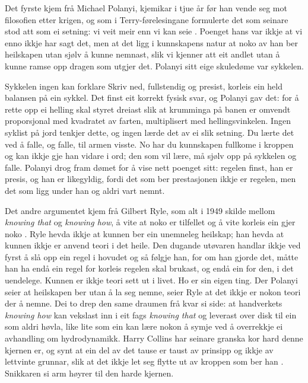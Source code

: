 Det fyrste kjem frå Michael Polanyi, kjemikar i tjue år før han vende seg mot filosofien etter krigen, og som i Terry-førelesingane formulerte det som seinare stod att som ei setning: vi veit meir enn vi kan seie \autocite{polanyi1966tacit}. Poenget hans var ikkje at vi enno ikkje har sagt det, men at det ligg i kunnskapens natur at noko av han ber heilskapen utan sjølv å kunne nemnast, slik vi kjenner att eit andlet utan å kunne ramse opp dragen som utgjer det. Polanyi sitt eige skuledøme var sykkelen.

\begin{kasus}{Sykkelen ingen kan forklare}
Skriv ned, fullstendig og presist, korleis ein held balansen på ein sykkel. Det finst eit korrekt fysisk svar, og Polanyi gav det: for å rette opp ei helling skal styret dreiast slik at krumminga på banen er omvendt proporsjonal med kvadratet av farten, multiplisert med hellingsvinkelen. Ingen syklist på jord tenkjer dette, og ingen lærde det av ei slik setning. Du lærte det ved å falle, og falle, til armen visste. No har du kunnskapen fullkome i kroppen og kan ikkje gje han vidare i ord; den som vil lære, må sjølv opp på sykkelen og falle. Polanyi drog fram dømet for å vise nett poenget sitt: regelen finst, han er presis, og han er likegyldig, fordi det som ber prestasjonen ikkje er regelen, men det som ligg under han og aldri vart nemnt.
\end{kasus}

Det andre argumentet kjem frå Gilbert Ryle, som alt i 1949 skilde mellom \emph{knowing that} og \emph{knowing how}, å vite at noko er tilfellet og å vite korleis ein gjer noko \autocite{ryle1949mind}. Ryle hevda ikkje at kunnen ber ein unemneleg heilskap; han hevda at kunnen ikkje er anvend teori i det heile. Den dugande utøvaren handlar ikkje ved fyrst å slå opp ein regel i hovudet og så følgje han, for om han gjorde det, måtte han ha endå ein regel for korleis regelen skal brukast, og endå ein for den, i det uendelege. Kunnen er ikkje teori sett ut i livet. Ho er sin eigen ting. Der Polanyi seier at heilskapen ber utan å la seg nemne, seier Ryle at det ikkje er nokon teori der å nemne. Dei to drep den same draumen frå kvar si side: at handverkets \emph{knowing how} kan vekslast inn i eit fags \emph{knowing that} og leverast over disk til ein som aldri høvla, like lite som ein kan lære nokon å symje ved å overrekkje ei avhandling om hydrodynamikk. Harry Collins har seinare granska kor hard denne kjernen er, og synt at ein del av det tause er taust av prinsipp og ikkje av lettvinte grunnar, slik at det ikkje let seg flytte ut av kroppen som ber han \autocite{collins2010tacit}. Snikkaren si arm høyrer til den harde kjernen.

